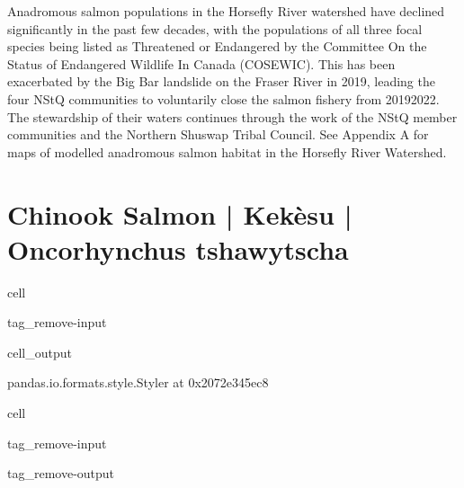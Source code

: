 \documentclass[letterpaper,10pt,english]{jupyterBook}
\begin{document}
\sphinxAtStartPar
Anadromous salmon populations in the Horsefly River watershed have declined significantly in the past few decades, with the populations of all three focal species being listed as Threatened or Endangered by the Committee On the Status of Endangered Wildlife In Canada (COSEWIC). This has been exacerbated by the Big Bar landslide on the Fraser River in 2019, leading the four NStQ communities to voluntarily close the salmon fishery from 2019\sphinxhyphen{}2022. The stewardship of their waters continues through the work of the NStQ member communities and the Northern Shuswap Tribal Council. See Appendix A for maps of modelled anadromous salmon habitat in the Horsefly River Watershed.


\section{Chinook Salmon | Kekèsu | Oncorhynchus tshawytscha}
\label{\detokenize{Planning:chinook-salmon-kekesu-oncorhynchus-tshawytscha}}
\begin{sphinxuseclass}{cell}
\begin{sphinxuseclass}{tag_remove-input}\begin{sphinxVerbatimOutput}

\begin{sphinxuseclass}{cell_output}
\begin{sphinxVerbatim}[commandchars=\\\{\}]
\PYGZlt{}pandas.io.formats.style.Styler at 0x2072e345ec8\PYGZgt{}
\end{sphinxVerbatim}

\end{sphinxuseclass}\end{sphinxVerbatimOutput}

\end{sphinxuseclass}
\end{sphinxuseclass}
\begin{sphinxuseclass}{cell}
\begin{sphinxuseclass}{tag_remove-input}
\begin{sphinxuseclass}{tag_remove-output}
\end{sphinxuseclass}
\end{sphinxuseclass}
\end{sphinxuseclass}
\end{document}
